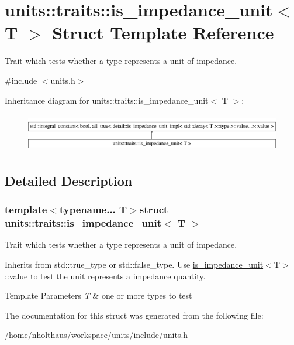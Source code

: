 \hypertarget{structunits_1_1traits_1_1is__impedance__unit}{}\section{units\+:\+:traits\+:\+:is\+\_\+impedance\+\_\+unit$<$ T $>$ Struct Template Reference}
\label{structunits_1_1traits_1_1is__impedance__unit}


Trait which tests whether a type represents a unit of impedance.  




{\ttfamily \#include $<$units.\+h$>$}

Inheritance diagram for units\+:\+:traits\+:\+:is\+\_\+impedance\+\_\+unit$<$ T $>$\+:\begin{figure}[H]
\begin{center}
\leavevmode
\includegraphics[height=1.715161cm]{structunits_1_1traits_1_1is__impedance__unit}
\end{center}
\end{figure}


\subsection{Detailed Description}
\subsubsection*{template$<$typename... T$>$struct units\+::traits\+::is\+\_\+impedance\+\_\+unit$<$ T $>$}

Trait which tests whether a type represents a unit of impedance. 

Inherits from {\ttfamily std\+::true\+\_\+type} or {\ttfamily std\+::false\+\_\+type}. Use {\ttfamily \hyperlink{structunits_1_1traits_1_1is__impedance__unit}{is\+\_\+impedance\+\_\+unit}$<$T$>$\+::value} to test the unit represents a impedance quantity. 
\begin{DoxyTemplParams}{Template Parameters}
{\em T} & one or more types to test \\
\hline
\end{DoxyTemplParams}


The documentation for this struct was generated from the following file\+:\begin{DoxyCompactItemize}
\item 
/home/nholthaus/workspace/units/include/\hyperlink{units_8h}{units.\+h}\end{DoxyCompactItemize}
